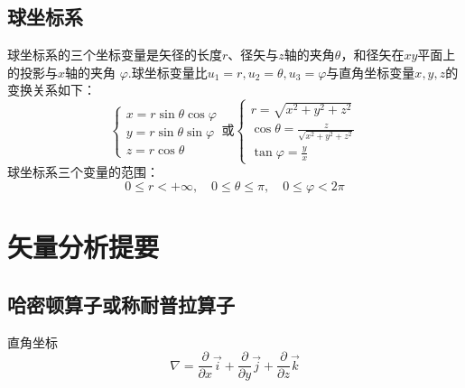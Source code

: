 \documentclass[12pt, UTF8, AutoFakeBold]{ctexart} %
\begin{document}
\subsection{球坐标系}
球坐标系的三个坐标变量是矢径的长度$r$、径矢与$z$轴的夹角$\theta$，和径矢在$xy$平面上的投影与$x$轴的夹角
$\varphi$.球坐标变量比$u_1 = r,u_2 = \theta,u_3 = \varphi$与直角坐标变量$x,y,z$的变换关系如下：
\[
    \begin{cases}
        x = r \sin\theta \cos\varphi\\
        y = r \sin\theta \sin\varphi\\
        z = r \cos\theta
    \end{cases}
    \text{或}
    \begin{cases}
        r = \sqrt{x^2 + y^2 + z^2}\\
        \cos\theta = \frac{z}{\sqrt{x^2 + y^2 + z^2}}\\
        \tan\varphi = \frac{y}{x}
    \end{cases}
\]
球坐标系三个变量的范围：
\[
    0 \leq r < +\infty, \quad
    0 \leq \theta \leq \pi, \quad
    0 \leq \varphi < 2\pi
\]

\begin{figure}[htbp]
    \centering
    \qquad
\end{figure}


\section{矢量分析提要}

\subsection{哈密顿算子或称耐普拉算子}
直角坐标
\[
    \nabla = \frac{\partial}{\partial x}\vec{i}
    + \frac{\partial}{\partial y}\vec{j}
    + \frac{\partial}{\partial z}\vec{k}
\]
\end{document}
